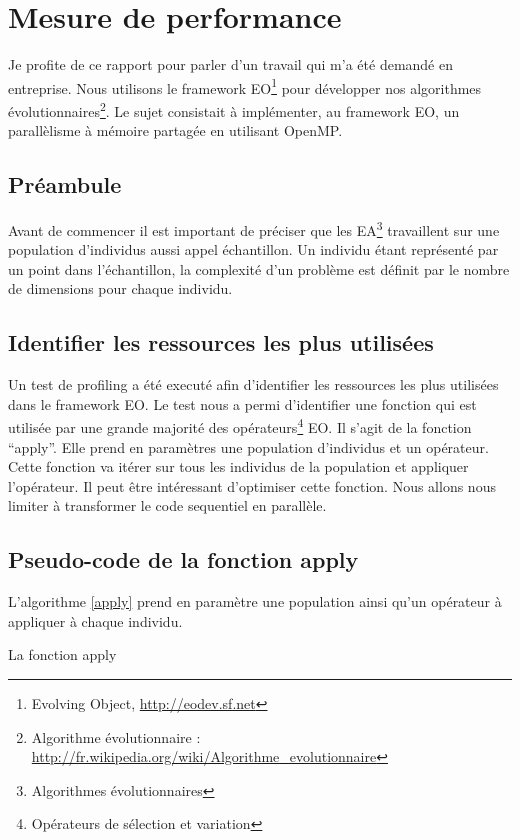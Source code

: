 \section{Mesure de performance}

Je profite de ce rapport pour parler d'un travail qui m'a été demandé en entreprise. Nous utilisons le framework EO\footnote{Evolving Object, \url{http://eodev.sf.net}} pour développer nos algorithmes évolutionnaires\footnote{Algorithme évolutionnaire : \url{http://fr.wikipedia.org/wiki/Algorithme_evolutionnaire}}. Le sujet consistait à implémenter, au framework EO, un parallèlisme à mémoire partagée en utilisant OpenMP.

\subsection{Préambule}

Avant de commencer il est important de préciser que les EA\footnote{Algorithmes évolutionnaires} travaillent sur une population d'individus aussi appel échantillon. Un individu étant représenté par un point dans l'échantillon, la complexité d'un problème est définit par le nombre de dimensions pour chaque individu.

\subsection{Identifier les ressources les plus utilisées}

Un test de profiling a été executé afin d'identifier les ressources les plus utilisées dans le framework EO. Le test nous a permi d'identifier une fonction qui est utilisée par une grande majorité des opérateurs\footnote{Opérateurs de sélection et variation} EO. Il s'agit de la fonction ``apply''. Elle prend en paramètres une population d'individus et un opérateur. Cette fonction va itérer sur tous les individus de la population et appliquer l'opérateur. Il peut être intéressant d'optimiser cette fonction. Nous allons nous limiter à transformer le code sequentiel en parallèle.

\subsection{Pseudo-code de la fonction apply}

L'algorithme \ref{apply} prend en paramètre une population ainsi qu'un opérateur à appliquer à chaque individu.

\incmargin{1em}
\begin{algorithm}[here]
  \dontprintsemicolon
  \label{apply}
  \caption{La fonction apply}
\end{algorithm}
\decmargin{1em}

